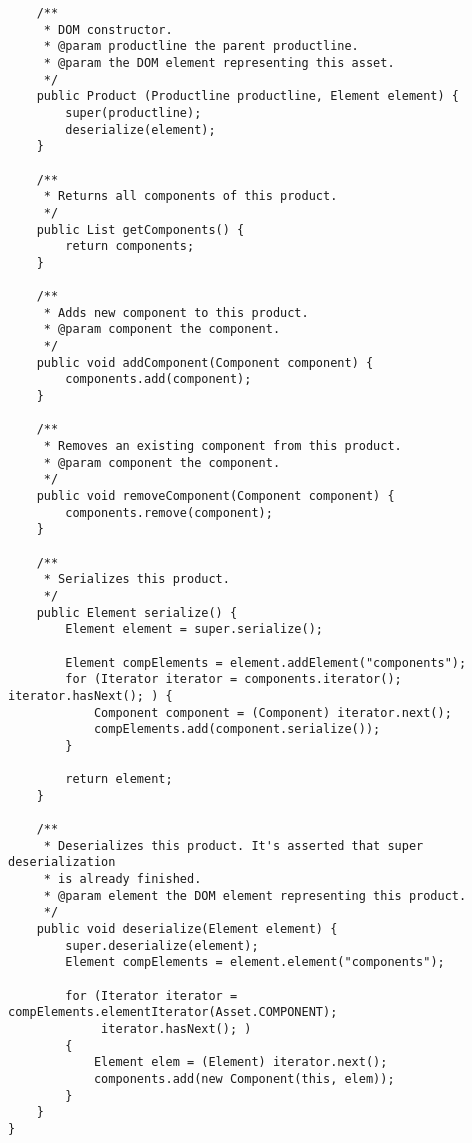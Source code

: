 \begin{verbatim}
	/**
	 * DOM constructor.
	 * @param productline the parent productline.
	 * @param the DOM element representing this asset.
	 */
	public Product (Productline productline, Element element) {
	    super(productline);
		deserialize(element);
	}
	
	/**
	 * Returns all components of this product.
	 */
	public List getComponents() {
		return components;
	}
	
	/**
	 * Adds new component to this product.
	 * @param component the component.
	 */
	public void addComponent(Component component) {
		components.add(component);
	}

	/**
	 * Removes an existing component from this product.
	 * @param component the component.
	 */
	public void removeComponent(Component component) {
		components.remove(component);
	}

	/**
	 * Serializes this product.
	 */
	public Element serialize() {
		Element element = super.serialize();
		
		Element compElements = element.addElement("components");
		for (Iterator iterator = components.iterator(); iterator.hasNext(); ) {
			Component component = (Component) iterator.next();
			compElements.add(component.serialize());
		}
		
		return element;
	}
	
	/**
	 * Deserializes this product. It's asserted that super deserialization
	 * is already finished.
	 * @param element the DOM element representing this product.
	 */
	public void deserialize(Element element) {
		super.deserialize(element);
	    Element compElements = element.element("components");
		
		for (Iterator iterator = compElements.elementIterator(Asset.COMPONENT);
			 iterator.hasNext(); )
		{
			Element elem = (Element) iterator.next();
			components.add(new Component(this, elem));
		}
	}
}

\end{verbatim}
